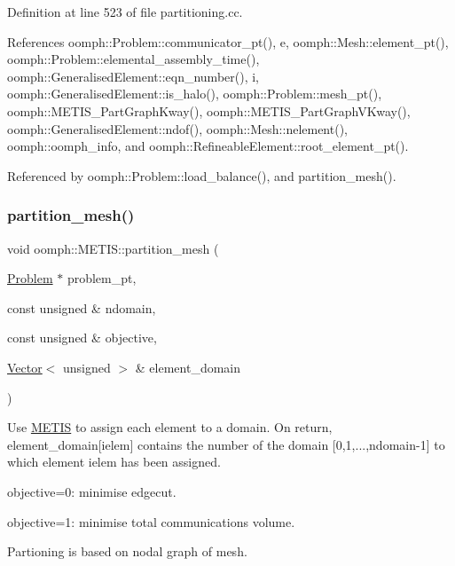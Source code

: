 Definition at line 523 of file partitioning.\+cc.



References oomph\+::\+Problem\+::communicator\+\_\+pt(), e, oomph\+::\+Mesh\+::element\+\_\+pt(), oomph\+::\+Problem\+::elemental\+\_\+assembly\+\_\+time(), oomph\+::\+Generalised\+Element\+::eqn\+\_\+number(), i, oomph\+::\+Generalised\+Element\+::is\+\_\+halo(), oomph\+::\+Problem\+::mesh\+\_\+pt(), oomph\+::\+M\+E\+T\+I\+S\+\_\+\+Part\+Graph\+Kway(), oomph\+::\+M\+E\+T\+I\+S\+\_\+\+Part\+Graph\+V\+Kway(), oomph\+::\+Generalised\+Element\+::ndof(), oomph\+::\+Mesh\+::nelement(), oomph\+::oomph\+\_\+info, and oomph\+::\+Refineable\+Element\+::root\+\_\+element\+\_\+pt().



Referenced by oomph\+::\+Problem\+::load\+\_\+balance(), and partition\+\_\+mesh().

\mbox{\label{namespaceoomph_1_1METIS_aa3c7e4be46d6148cc60f43354127fc94}} 
\subsubsection{\texorpdfstring{partition\+\_\+mesh()}{partition\_mesh()}\hspace{0.1cm}{\footnotesize\ttfamily [1/2]}}
{\footnotesize\ttfamily void oomph\+::\+M\+E\+T\+I\+S\+::partition\+\_\+mesh (\begin{DoxyParamCaption}\item[{\hyperlink{classoomph_1_1Problem}{Problem} $\ast$}]{problem\+\_\+pt,  }\item[{const unsigned \&}]{ndomain,  }\item[{const unsigned \&}]{objective,  }\item[{\hyperlink{classoomph_1_1Vector}{Vector}$<$ unsigned $>$ \&}]{element\+\_\+domain }\end{DoxyParamCaption})}



Use \hyperlink{namespaceoomph_1_1METIS}{M\+E\+T\+IS} to assign each element to a domain. On return, element\+\_\+domain\mbox{[}ielem\mbox{]} contains the number of the domain \mbox{[}0,1,...,ndomain-\/1\mbox{]} to which element ielem has been assigned. 


\begin{DoxyItemize}
\item objective=0\+: minimise edgecut.
\item objective=1\+: minimise total communications volume.
\end{DoxyItemize}Partioning is based on nodal graph of mesh.

